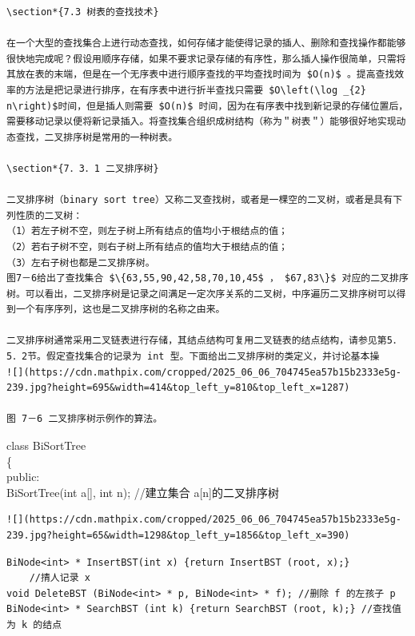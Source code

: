 \documentclass[10pt]{article}
\begin{document}
\begin{verbatim}
\section*{7.3 树表的查找技术}

在一个大型的查找集合上进行动态查找，如何存储才能使得记录的插人、删除和查找操作都能够很快地完成呢？假设用顺序存储，如果不要求记录存储的有序性，那么插人操作很简单，只需将其放在表的末端，但是在一个无序表中进行顺序查找的平均查找时间为 $O(n)$ 。提高查找效率的方法是把记录进行排序，在有序表中进行折半查找只需要 $O\left(\log _{2} n\right)$时间，但是插人则需要 $O(n)$ 时间，因为在有序表中找到新记录的存储位置后，需要移动记录以便将新记录插入。将查找集合组织成树结构（称为＂树表＂）能够很好地实现动态查找，二叉排序树是常用的一种树表。

\section*{7．3．1 二叉排序树}

二叉排序树（binary sort tree）又称二叉查找树，或者是一棵空的二叉树，或者是具有下列性质的二叉树：
（1）若左子树不空，则左子树上所有结点的值均小于根结点的值；
（2）若右子树不空，则右子树上所有结点的值均大于根结点的值；
（3）左右子树也都是二叉排序树。
图7－6给出了查找集合 $\{63,55,90,42,58,70,10,45$ ， $67,83\}$ 对应的二叉排序树。可以看出，二叉排序树是记录之间满足一定次序关系的二叉树，中序遍历二叉排序树可以得到一个有序序列，这也是二叉排序树的名称之由来。

二叉排序树通常采用二叉链表进行存储，其结点结构可复用二叉链表的结点结构，请参见第5．5．2节。假定查找集合的记录为 int 型。下面给出二叉排序树的类定义，并讨论基本操
![](https://cdn.mathpix.com/cropped/2025_06_06_704745ea57b15b2333e5g-239.jpg?height=695&width=414&top_left_y=810&top_left_x=1287)

图 7－6 二叉排序树示例作的算法。
\end{verbatim}

class BiSortTree\\
\{\\
public:\\[0pt]
BiSortTree(int a[], int n); //建立集合 a[n]的二叉排序树

\begin{verbatim}
![](https://cdn.mathpix.com/cropped/2025_06_06_704745ea57b15b2333e5g-239.jpg?height=65&width=1298&top_left_y=1856&top_left_x=390)
\end{verbatim}

\begin{verbatim}
BiNode<int> * InsertBST(int x) {return InsertBST (root, x);}
    //掅人记录 x
void DeleteBST (BiNode<int> * p, BiNode<int> * f); //删除 f 的左孩子 p
BiNode<int> * SearchBST (int k) {return SearchBST (root, k);} //查找值为 k 的结点
\end{verbatim}
\end{document}

